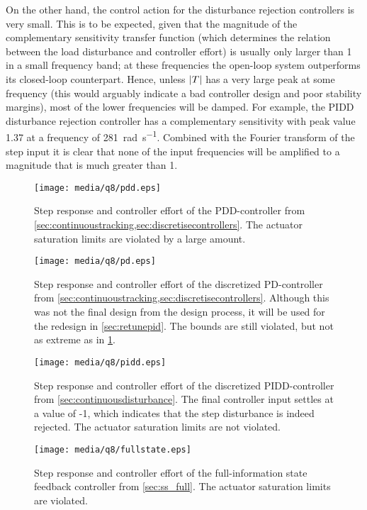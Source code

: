 On the other hand, the control action for the disturbance rejection controllers is very small. This is to be expected, given that the magnitude of the complementary sensitivity transfer function (which determines the relation between the load disturbance and controller effort) is usually only larger than 1 in a small frequency band; at these frequencies the open-loop system outperforms its closed-loop counterpart. Hence, unless $\abs{T}$ has a very large peak at some frequency (this would arguably indicate a bad controller design and poor stability margins), most of the lower frequencies will be damped. For example, the PIDD disturbance rejection controller has a complementary sensitivity with peak value 1.37 at a frequency of \SI{281}{\radian\per\second}. Combined with the Fourier transform of the step input it is clear that none of the input frequencies will be amplified to a magnitude that is much greater than 1.
\begin{figure}[ht!]
    \centering
    \texttt{[image: media/q8/pdd.eps]}
    \caption{Step response and controller effort of the PDD-controller from \cref{sec:continuoustracking,sec:discretisecontrollers}. The actuator saturation limits are violated by a large amount.}
    \label{fig:q8_pdd}
\end{figure}
\begin{figure}[ht!]
    \centering
    \texttt{[image: media/q8/pd.eps]}
    \caption{Step response and controller effort of the discretized PD-controller from \cref{sec:continuoustracking,sec:discretisecontrollers}. Although this was not the final design from the design process, it will be used for the redesign in \cref{sec:retunepid}. The bounds are still violated, but not as extreme as in \cref{fig:q8_pdd}.}
    \label{fig:q8_pd}
\end{figure}
\begin{figure}[ht!]
    \centering
    \texttt{[image: media/q8/pidd.eps]}
    \caption{Step response and controller effort of the discretized PIDD-controller from \cref{sec:continuousdisturbance}. The final controller input settles at a value of -1, which indicates that the step disturbance is indeed rejected. The actuator saturation limits are not violated.}
    \label{fig:q8_pidd}
\end{figure}
\begin{figure}[ht!]
    \centering
    \texttt{[image: media/q8/fullstate.eps]}
    \caption{Step response and controller effort of the full-information state feedback controller from \cref{sec:ss_full}. The actuator saturation limits are violated.}
    \label{fig:q8_fullstate}
\end{figure}

